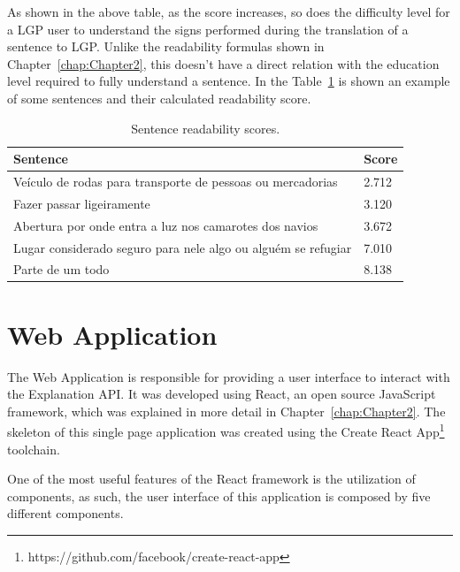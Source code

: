 As shown in the above table, as the score increases, so does the difficulty level for a \gls{LGP} user to understand the signs performed during the translation of a sentence to \gls{LGP}.
Unlike the readability formulas shown in Chapter~\ref{chap:Chapter2}, this doesn't have a direct relation with the education level required to fully understand a sentence.
In the Table~\ref{table:sentences} is shown an example of some sentences and their calculated readability score.

\begin{table}[H]
    \centering
    \caption{Sentence readability scores.}
    \label{table:sentences}
    \begin{tabular}{l|l}
        {\bfseries Sentence} & {\bfseries Score} \\
        \hline
        Veículo de rodas para transporte de pessoas ou mercadorias & 2.712  \\
        \hline
        Fazer passar ligeiramente & 3.120  \\
        \hline
        Abertura por onde entra a luz nos camarotes dos navios & 3.672 \\
        \hline
        Lugar considerado seguro para nele algo ou alguém se refugiar & 7.010 \\
        \hline
        Parte de um todo & 8.138 \\
    \end{tabular}
\end{table}

\section{Web Application}

The Web Application is responsible for providing a user interface to interact with the Explanation API.
It was developed using React, an open source JavaScript framework, which was explained in more detail in Chapter~\ref{chap:Chapter2}.
The skeleton of this single page application was created using the Create React App\footnote{https://github.com/facebook/create-react-app} toolchain.

One of the most useful features of the React framework is the utilization of components, as such, the user interface of this application is composed by five different components.

